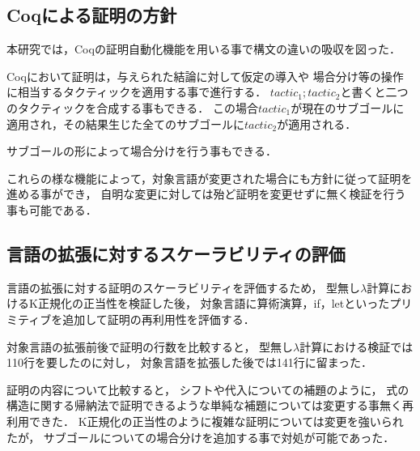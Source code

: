 \documentclass[T]{compsoft}
\begin{document}
\subsection{Coqによる証明の方針}
本研究では，Coqの証明自動化機能を用いる事で構文の違いの吸収を図った．

Coqにおいて証明は，与えられた結論に対して仮定の導入や
場合分け等の操作に相当するタクティックを適用する事で進行する\cite{09thecoq}．
$\mathit{tactic}_1;\mathit{tactic}_2$と書くと二つのタクティックを合成する事もできる．
この場合$\mathit{tactic}_1$が現在のサブゴールに適用され，その結果生じた全てのサブゴールに$\mathit{tactic}_2$が適用される．

サブゴールの形によって場合分けを行う事もできる．

これらの様な機能によって，対象言語が変更された場合にも方針に従って証明を進める事ができ，
自明な変更に対しては殆ど証明を変更せずに無く検証を行う事も可能である．

\subsection{言語の拡張に対するスケーラビリティの評価}
言語の拡張に対する証明のスケーラビリティを評価するため，
型無し$\lambda$計算におけるK正規化の正当性を検証した後，
対象言語に算術演算，if，letといったプリミティブを追加して証明の再利用性を評価する．

対象言語の拡張前後で証明の行数を比較すると，
型無し$\lambda$計算における検証では110行を要したのに対し，
対象言語を拡張した後では141行に留まった．

証明の内容について比較すると，
シフトや代入についての補題のように，
式の構造に関する帰納法で証明できるような単純な補題については変更する事無く再利用できた．
K正規化の正当性のように複雑な証明については変更を強いられたが，
サブゴールについての場合分けを追加する事で対処が可能であった．
\end{document}
